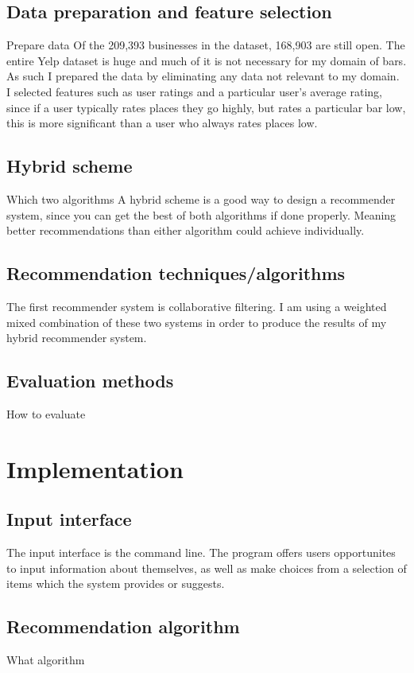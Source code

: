 \documentclass[conference]{IEEEtran}
\begin{document}
\subsection{Data preparation and feature selection}
Prepare data
Of the 209,393 businesses in the dataset, 168,903 are still open.
The entire Yelp dataset is huge and much of it is not necessary for my domain of bars.
As such I prepared the data by eliminating any data not relevant to my domain.
I selected features such as user ratings and a particular user's average rating,
since if a user typically rates places they go highly, but rates a particular bar low,
this is more significant than a user who always rates places low.

\subsection{Hybrid scheme}
Which two algorithms
A hybrid scheme is a good way to design a recommender system, since you can get the
best of both algorithms if done properly.
Meaning better recommendations than either algorithm could achieve individually.

\subsection{Recommendation techniques/algorithms}
The first recommender system is collaborative filtering.
I am using a weighted mixed combination of these two systems in order to produce the results
of my hybrid recommender system.

\subsection{Evaluation methods}
How to evaluate


\section{Implementation}

\subsection{Input interface}
The input interface is the command line.
The program offers users opportunites to input information about themselves,
as well as make choices from a selection of items which the system provides or suggests.

\subsection{Recommendation algorithm}
What algorithm
\end{document}
